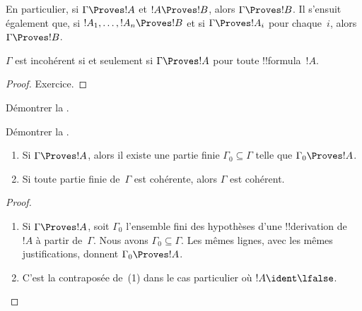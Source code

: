 \documentclass[../../../include/open-logic-section]{subfiles}
\begin{document}
En particulier, si $\Gamma \Proves !A$ et $!A \Proves !B$, alors
$\Gamma \Proves !B$. Il s'ensuit également que, si
$!A_1, \dots, !A_n \Proves !B$ et si $\Gamma \Proves !A_i$ pour
chaque~$i$, alors $\Gamma \Proves !B$.

\begin{prop}
$\Gamma$ est incohérent si et seulement si
$\Gamma \Proves !A$ pour toute !!{formula}~$!A$.
\end{prop}

\begin{proof}
Exercice.
\end{proof}

\begin{prob}
Démontrer la .
\end{prob}
\tagendprob

\begin{prob}
Démontrer la .
\end{prob}
\tagendprob

\begin{prop}[Compacité]
\begin{enumerate}
\item Si $\Gamma \Proves !A$, alors il existe une partie finie
  $\Gamma_0 \subseteq \Gamma$ telle que $\Gamma_0 \Proves !A$.
\item Si toute partie finie de~$\Gamma$ est cohérente, alors
  $\Gamma$ est cohérent.
\end{enumerate}
\end{prop}

\begin{proof}
\begin{enumerate}
\item Si $\Gamma \Proves !A$, soit $\Gamma_0$ l'ensemble fini des
  hypothèses d'une !!{derivation} de~$!A$ à partir de~$\Gamma$.
  Nous avons $\Gamma_0\subseteq\Gamma$. Les mêmes lignes, avec les
  mêmes justifications, donnent $\Gamma_0 \Proves !A$.
\item C'est la contraposée de~(1) dans le cas particulier où
  $!A \ident \lfalse$.
\end{enumerate}
\end{proof}
\end{document}
